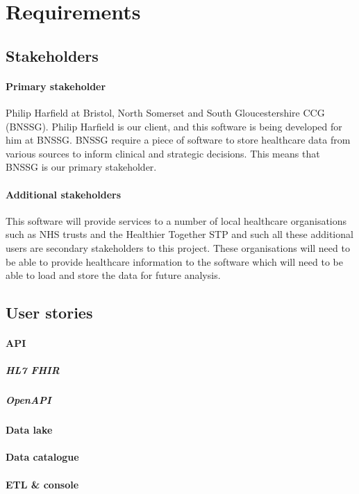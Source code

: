 \documentclass[10pt]{article}
\begin{document}
\newpage


\section{Requirements}
\subsection{Stakeholders}
\paragraph{Primary stakeholder}
Philip Harfield at Bristol, North Somerset and South Gloucestershire CCG (BNSSG). Philip Harfield is our client, and this software is being developed for him at BNSSG. BNSSG require a piece of software to store healthcare data from various sources to inform clinical and strategic decisions. This means that BNSSG is our primary stakeholder.
\paragraph{Additional stakeholders}
This software will provide services to a number of local healthcare organisations such as NHS trusts and the Healthier Together STP and such all these additional users are secondary stakeholders to this project. These organisations will need to be able to provide healthcare information to the software which will need to be able to load and store the data for future analysis.

\subsection{User stories}
\paragraph{API}
\subparagraph{HL7 FHIR}
\subparagraph{OpenAPI}

\paragraph{Data lake}
\paragraph{Data catalogue}
\paragraph{ETL \& console}
\end{document}
